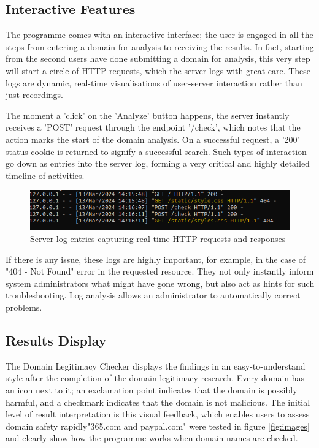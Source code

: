 \subsection{Interactive Features}

The programme comes with an interactive interface; the user is engaged in all the steps from entering a domain for analysis to receiving the results. In fact, starting from the second users have done submitting a domain for analysis, this very step will start a circle of HTTP-requests, which the server logs with great care. These logs are dynamic, real-time visualisations of user-server interaction rather than just recordings.


The moment a 'click' on the 'Analyze' button happens, the server instantly receives a 'POST' request through the endpoint '/check', which notes that the action marks the start of the domain analysis. On a successful request, a '200' status cookie is returned to signify a successful search. Such types of interaction go down as entries into the server log, forming a very critical and highly detailed timeline of activities.
\begin{figure}[H]
    \centering
    \includegraphics[width=0.8\linewidth]{project/I.png}
    \caption{Server log entries capturing real-time HTTP requests and responses}
    \label{fig:imple22222}
\end{figure}

If there is any issue, these logs are highly important, for example, in the case of "404 - Not Found" error in the requested resource. They not only instantly inform system administrators what might have gone wrong, but also act as hints for such troubleshooting. Log analysis allows an administrator to automatically correct problems.

\subsection{Results Display}

The Domain Legitimacy Checker displays the findings in an easy-to-understand style after the completion of the domain legitimacy research. Every domain has an icon next to it; an exclamation point indicates that the domain is possibly harmful, and a checkmark indicates that the domain is not malicious. The initial level of result interpretation is this visual feedback, which enables users to assess domain safety rapidly"365.com and paypal.com" were tested in figure \ref{fig:images} and clearly show how the programme works when domain names are checked. 

